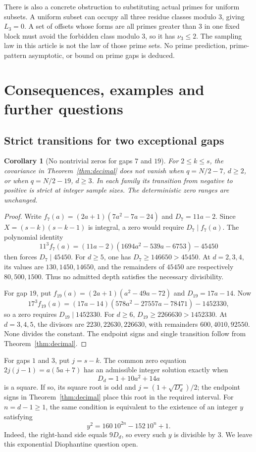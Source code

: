 \documentclass[11pt,a4paper]{article}
\newtheorem{corollary}[theorem]{Corollary}
\theoremstyle{remark}
\numberwithin{equation}{section}
\begin{document}
There is also a concrete obstruction to substituting actual primes
for uniform subsets. A uniform subset can occupy all three residue
classes modulo \(3\), giving \(L_3=0\).
A set of offsets whose forms are all primes greater than \(3\)
in one fixed block must avoid the forbidden class modulo \(3\),
so it has \(\nu_3\le2\).
The sampling law in this article is not the law of those prime sets.
No prime prediction, prime-pattern asymptotic, or bound on prime gaps
is deduced.

\section{Consequences, examples and further questions}\label{sec:scope}

\subsection{Strict transitions for two exceptional gaps}

\begin{corollary}[No nontrivial zeros for gaps \(7\) and \(19\)]
\label{cor:nonzero}
For \(2\le k\le s\), the covariance in Theorem~\ref{thm:decimal}
does not vanish when \(q=N/2-7\), \(d\ge2\), or when
\(q=N/2-19\), \(d\ge3\).
In each family its transition from negative to positive is strict
at integer sample sizes. The deterministic zero ranges are unchanged.
\end{corollary}
\begin{proof}
Write \(f_7(a)=(2a+1)(7a^2-7a-24)\) and \(D_7=11a-2\).
Since \(X=(s-k)(s-k-1)\) is integral, a zero would require
\(D_7\mid f_7(a)\). The polynomial identity
\[
 11^3f_7(a)
 =(11a-2)(1694a^2-539a-6753)-45450
\]
then forces \(D_7\mid45450\).
For \(d\ge5\), one has \(D_7\ge146650>45450\).
At \(d=2,3,4\), its values are \(130,1450,14650\), and the
remainders of \(45450\) are respectively \(80,500,1500\).
Thus no admitted depth satisfies the necessary divisibility.

For gap \(19\), put \(f_{19}(a)=(2a+1)(a^2-49a-72)\) and
\(D_{19}=17a-14\). Now
\[
 17^3f_{19}(a)
 =(17a-14)(578a^2-27557a-78471)-1452330,
\]
so a zero requires \(D_{19}\mid1452330\).
For \(d\ge6\), \(D_{19}\ge2266630>1452330\).
At \(d=3,4,5\), the divisors are \(2230,22630,226630\), with
remainders \(600,4010,92550\). None divides the constant.
The endpoint signs and single transition follow from
Theorem~\ref{thm:decimal}.
\end{proof}

For gaps \(1\) and \(3\), put \(j=s-k\).
The common zero equation \(2j(j-1)=a(5a+7)\) has an admissible
integer solution exactly when
\begin{equation}\label{eq:remainingzeros}
 D_d=1+10a^2+14a
\end{equation}
is a square. If so, its square root is odd and
\(j=(1+\sqrt{D_d})/2\); the endpoint signs in
Theorem~\ref{thm:decimal} place this root in the required interval.
For \(n=d-1\ge1\), the same condition is equivalent to the existence of
an integer \(y\) satisfying
\[
 y^2=160\,10^{2n}-152\,10^n+1.
\]
Indeed, the right-hand side equals \(9D_d\), so every such \(y\)
is divisible by \(3\). We leave this exponential Diophantine
question open.
\end{document}
